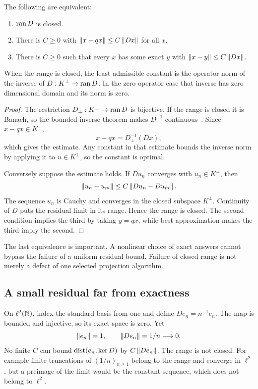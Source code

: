 \begin{theorem}\label{KS43}
The following are equivalent:
\begin{enumerate}
\item \(\operatorname{ran} D\) is closed.
\item There is \(C\ge0\) with \(\left\lVert x-qx\right\rVert\le C\left\lVert Dx\right\rVert\) for all \(x\).
\item There is \(C\ge0\) such that every \(x\) has some exact \(y\) with \(\left\lVert x-y\right\rVert\le C\left\lVert Dx\right\rVert\).
\end{enumerate}
When the range is closed, the least admissible constant is the operator norm of the inverse of \(D:K^\perp\to\operatorname{ran} D\). In the zero operator case that inverse has zero dimensional domain and its norm is zero.
\end{theorem}
\begin{proof}
The restriction \(D_\perp:K^\perp\to\operatorname{ran} D\) is bijective. If the range is closed it is Banach, so the bounded inverse theorem makes \(D_\perp^{-1}\) continuous~\cite{mathlib-banach}. Since \(x-qx\in K^\perp\),
\[
 x-qx=D_\perp^{-1}(Dx),
\]
which gives the estimate. Any constant in that estimate bounds the inverse norm by applying it to \(u\in K^\perp\), so the constant is optimal.

Conversely suppose the estimate holds. If \(Du_n\) converges with \(u_n\in K^\perp\), then
\[
 \left\lVert u_n-u_m\right\rVert\le C\left\lVert Du_n-Du_m\right\rVert.
\]
The sequence \(u_n\) is Cauchy and converges in the closed subspace \(K^\perp\). Continuity of \(D\) puts the residual limit in its range. Hence the range is closed. The second condition implies the third by taking \(y=qx\), while best approximation makes the third imply the second.
\end{proof}
The last equivalence is important. A nonlinear choice of exact answers cannot bypass the failure of a uniform residual bound. Failure of closed range is not merely a defect of one selected projection algorithm.

\subsection{A small residual far from exactness}
On \(\ell^2(\mathbb N)\), index the standard basis from one and define \(De_n=n^{-1}e_n\). The map is bounded and injective, so its exact space is zero. Yet
\[
 \left\lVert e_n\right\rVert=1,\qquad\left\lVert De_n\right\rVert=1/n\longrightarrow0.
\]
No finite \(C\) can bound \(\operatorname{dist}(e_n,\ker D)\) by \(C\left\lVert De_n\right\rVert\). The range is not closed. For example finite truncations of \((1/n)_{n\ge1}\) belong to the range and converge in \(\ell^2\), but a preimage of the limit would be the constant sequence, which does not belong to \(\ell^2\).

